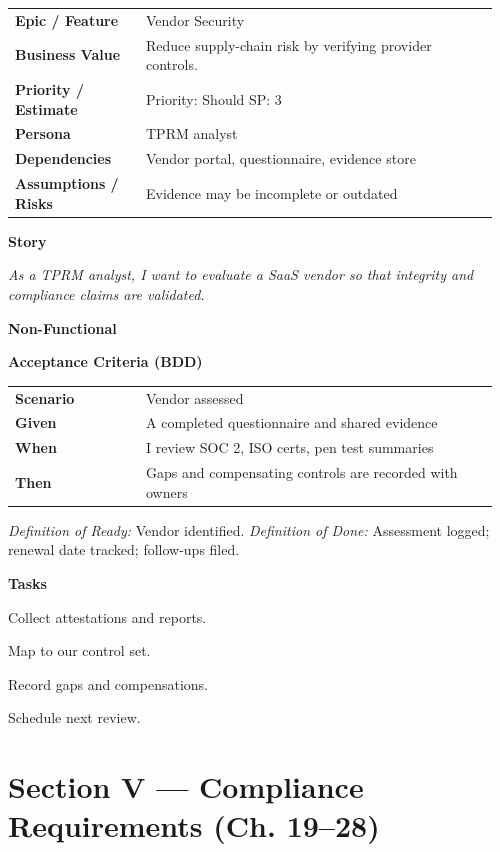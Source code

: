 \documentclass[11pt,letterpaper]{article}
\makeatletter
\newenvironment{kvtable}{%
  \par\noindent\begin{tabular}{@{}>{\raggedright\bfseries\arraybackslash}p{0.26\linewidth} >{\raggedright\arraybackslash}p{0.70\linewidth}@{}}
}{\end{tabular}\par}
\newenvironment{bdd}{%
  \par\noindent\begin{tabular}{@{}>{\raggedright\bfseries\arraybackslash}p{0.26\linewidth} >{\raggedright\arraybackslash}p{0.70\linewidth}@{}}
}{\end{tabular}\par}
\newcommand{\DoRDoD}[2]{%
  \vspace{0.35em}
  {\footnotesize\color{Muted}%
    \textit{Definition of Ready:} #1 \; \textbullet\;
    \textit{Definition of Done:} #2%
  }%
}
\newenvironment{storycard}[2]{%
  \begin{tcolorbox}[cloudcard, title={#1 --- #2}]%
}{\end{tcolorbox}}
\newcommand{\sectionlabel}[1]{\par\vspace{0.35em}\textbf{#1}\par}
\makeatother
\begin{document}
\begin{storycard}{CCS-18}{Ch. 18 — Third-Party Provider Integrity}
\begin{kvtable}
Epic / Feature & Vendor Security\\
Business Value & Reduce supply-chain risk by verifying provider controls.\\
Priority / Estimate & Priority: Should \quad SP: 3\\
Persona & TPRM analyst\\
Dependencies & Vendor portal, questionnaire, evidence store\\
Assumptions / Risks & Evidence may be incomplete or outdated\\
\end{kvtable}
\sectionlabel{Story}
\textit{As a TPRM analyst, I want to evaluate a SaaS vendor so that integrity and compliance claims are validated.}
\sectionlabel{Non-Functional}\;
\sectionlabel{Acceptance Criteria (BDD)}
\begin{bdd}
Scenario & Vendor assessed\\
Given & A completed questionnaire and shared evidence\\
When & I review SOC 2, ISO certs, pen test summaries\\
Then & Gaps and compensating controls are recorded with owners\\
\end{bdd}
\DoRDoD{Vendor identified.}{Assessment logged; renewal date tracked; follow-ups filed.}
\sectionlabel{Tasks}
\begin{checklist}
\item Collect attestations and reports.
\item Map to our control set.
\item Record gaps and compensations.
\item Schedule next review.
\end{checklist}
\end{storycard}

\section{Section V — Compliance Requirements (Ch. 19--28)}
\end{document}
